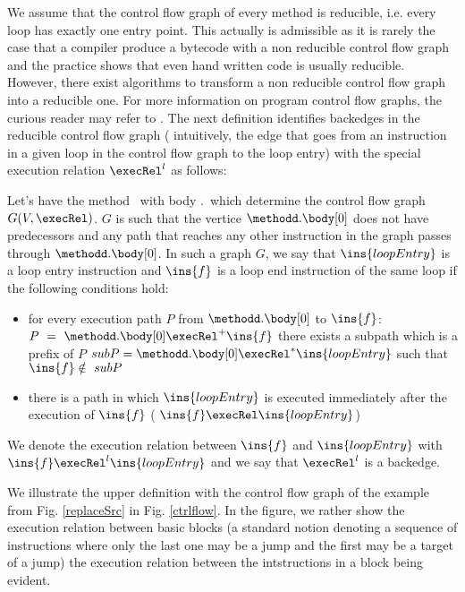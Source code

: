 We assume that the control flow graph of every method is reducible, i.e. every loop has exactly one entry point. This actually is admissible
as it is rarely the case that a compiler produce a bytecode with a non reducible control flow graph and the practice shows that even hand written
code is usually reducible. However, there exist algorithms to transform a non reducible control flow graph into a reducible one. 
For more information on program control flow graphs, the curious reader may refer to \cite{ARUCom1986}.
The next definition identifies backedges in the reducible control flow graph ( intuitively, the edge that goes 
from an instruction in a given loop in the control flow graph to the loop entry)  with the special execution relation $\execRel^l$ as follows:
 
\begin{defLoop}
\label{defLoop}
Let's have the method \methodd \ with body \methodd.\body \ which determine the control flow graph $G(V, \execRel) $.  $G$ is such that 
the vertice  $\methodd.\body[0]$ does not have predecessors and any path that reaches any other instruction in the graph
passes through $\methodd.\body[0]$. In such a graph $G$, we say that $\ins{loopEntry}$ is a loop entry instruction and $\ins{f}$ is a loop end instruction
 of the same loop if the following conditions hold:
\begin{itemize}
\item for every execution path $P$ from $\methodd.\body[0]$ to  $\ins{f}$:   $P~=~\methodd.\body[0] \execRel^{+} \ins{f}$
 there exists a subpath which is a prefix of $P$  $subP = \methodd.\body[0] \execRel^{*} \ins{loopEntry}$ such that $\ins{f} \notin  \ subP  $
\item there is a path in which $\ins{loopEntry}$  is executed immediately after the execution of $\ins{f}$ ( $\ins{f} \execRel \ins{loopEntry}$)
\end{itemize}
We denote the execution relation between $\ins{f}$ and  $\ins{loopEntry}$ with \\
$\ins{f} \execRel^l \ins{loopEntry}$ and we say that $  \execRel^l $  is a backedge. 
\end{defLoop}
We illustrate the upper definition with the control flow graph of the example from Fig. \ref{replaceSrc} in Fig. \ref{ctrlflow}.
In the figure, we rather show the execution relation between basic blocks (a standard notion denoting a sequence of instructions where
only the last one may be a jump and the first may be a target of a jump) the execution relation between the 
intstructions in a block being evident.


